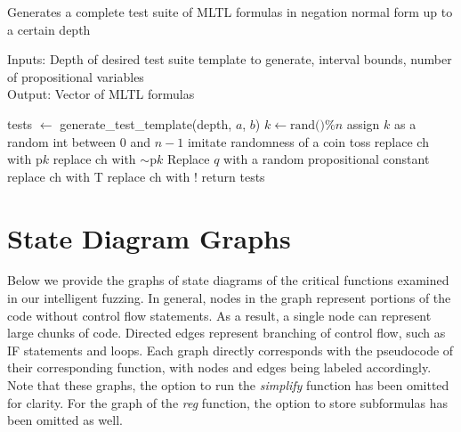\documentclass[runningheads]{llncs}
\begin{document}
\begin{algorithm}[H]
    \caption{Generates a complete test suite of MLTL formulas in negation normal form up to a certain depth}
    Inputs: Depth of desired test suite template to generate, interval bounds, number of propositional variables\\
    Output: Vector of MLTL formulas
    \begin{algorithmic}
        \State tests $\leftarrow$ generate\_test\_template(depth, $a$, $b$) 
                    \State $k \leftarrow \text{rand()} \% n$ 
                    \Comment assign $k$ as a random int between $0$ and $n - 1$
                    \Comment imitate randomness of a coin toss
                        \State replace ch with p$k$
                    \Else 
                        \State replace ch with $\scriptstyle{\sim}$p$k$
                    \EndIf
                \Comment Replace $q$ with a random propositional constant
                        \State replace ch with T
                    \Else 
                        \State replace ch with $!$
                    \EndIf
                \EndIf
            \EndFor
        \EndFor
    \State return tests
    \EndProcedure
    \end{algorithmic}
\end{algorithm}


\newpage
\section{State Diagram Graphs} \label{graphs appendix}
Below we provide the graphs of state diagrams of the critical functions examined in our intelligent fuzzing. In general, nodes in the graph represent portions of the code without control flow statements. As a result, a single node can represent large chunks of code. Directed edges represent branching of control flow, such as IF statements and loops. Each graph directly corresponds with the pseudocode of their corresponding function, with nodes and edges being labeled accordingly. Note that these graphs, the option to run the \textit{simplify} function has been omitted for clarity. For the graph of the \textit{reg} function, the option to store subformulas has been omitted as well.\\
\end{document}
